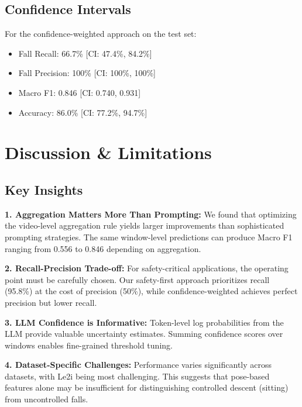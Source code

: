 \documentclass[conference]{IEEEtran}
\begin{document}
\subsection{Confidence Intervals}

For the confidence-weighted approach on the test set:
\begin{itemize}
    \item Fall Recall: 66.7\% [CI: 47.4\%, 84.2\%]
    \item Fall Precision: 100\% [CI: 100\%, 100\%]
    \item Macro F1: 0.846 [CI: 0.740, 0.931]
    \item Accuracy: 86.0\% [CI: 77.2\%, 94.7\%]
\end{itemize}

\section{Discussion \& Limitations}

\subsection{Key Insights}

\textbf{1. Aggregation Matters More Than Prompting:}
We found that optimizing the video-level aggregation rule yields larger improvements than sophisticated prompting strategies. The same window-level predictions can produce Macro F1 ranging from 0.556 to 0.846 depending on aggregation.

\textbf{2. Recall-Precision Trade-off:}
For safety-critical applications, the operating point must be carefully chosen. Our safety-first approach prioritizes recall (95.8\%) at the cost of precision (50\%), while confidence-weighted achieves perfect precision but lower recall.

\textbf{3. LLM Confidence is Informative:}
Token-level log probabilities from the LLM provide valuable uncertainty estimates. Summing confidence scores over windows enables fine-grained threshold tuning.

\textbf{4. Dataset-Specific Challenges:}
Performance varies significantly across datasets, with Le2i being most challenging. This suggests that pose-based features alone may be insufficient for distinguishing controlled descent (sitting) from uncontrolled falls.
\end{document}
